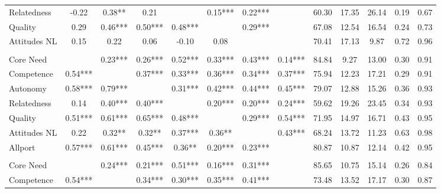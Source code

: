 \begin{table}
\begin{minipage}[t][\textheight][t]{\textwidth}
{\begin{tabular}[t]{lcccccccccccc}
\hspace{1em}Relatedness & -0.22 & 0.38** & 0.21 &  & 0.15*** & 0.22*** &  & 60.30 & 17.35 & 26.14 & 0.19 & 0.67\\
\hspace{1em}Quality & 0.29 & 0.46*** & 0.50*** & 0.48*** &  & 0.29*** &  & 67.08 & 12.54 & 16.54 & 0.24 & 0.73\\
\hspace{1em}Attitudes NL & 0.15 & 0.22 & 0.06 & -0.10 & 0.08 &  &  & 70.41 & 17.13 & 9.87 & 0.72 & 0.96\\
\addlinespace[0.3em]
\multicolumn{13}{l}{\textbf{Study 3}}\\
\hspace{1em}Core Need &  & 0.23*** & 0.26*** & 0.52*** & 0.33*** & 0.43*** & 0.14*** & 84.84 & 9.27 & 13.00 & 0.30 & 0.91\\
\hspace{1em}Competence & 0.54*** &  & 0.37*** & 0.33*** & 0.36*** & 0.34*** & 0.37*** & 75.94 & 12.23 & 17.21 & 0.29 & 0.91\\
\hspace{1em}Autonomy & 0.58*** & 0.79*** &  & 0.31*** & 0.42*** & 0.44*** & 0.45*** & 79.07 & 12.88 & 15.26 & 0.36 & 0.93\\
\hspace{1em}Relatedness & 0.14 & 0.40*** & 0.40*** &  & 0.20*** & 0.20*** & 0.24*** & 59.62 & 19.26 & 23.45 & 0.34 & 0.93\\
\hspace{1em}Quality & 0.51*** & 0.61*** & 0.65*** & 0.48*** &  & 0.29*** & 0.54*** & 71.95 & 14.97 & 16.71 & 0.43 & 0.95\\
\hspace{1em}Attitudes NL & 0.22 & 0.32** & 0.32** & 0.37*** & 0.36** &  & 0.43*** & 68.24 & 13.72 & 11.23 & 0.63 & 0.98\\
\hspace{1em}Allport & 0.57*** & 0.61*** & 0.45*** & 0.36** & 0.20*** & 0.23*** &  & 80.87 & 10.87 & 12.14 & 0.42 & 0.95\\
\addlinespace[0.3em]
\multicolumn{13}{l}{\textbf{Across Studies}}\\
\hspace{1em}Core Need &  & 0.24*** & 0.21*** & 0.51*** & 0.16*** & 0.31*** &  & 85.65 & 10.75 & 15.14 & 0.26 & 0.84\\
\hspace{1em}Competence & 0.54*** &  & 0.34*** & 0.30*** & 0.35*** & 0.41*** &  & 73.48 & 13.52 & 17.17 & 0.30 & 0.87\\

\end{tabular}}
\end{minipage}
\end{table}
